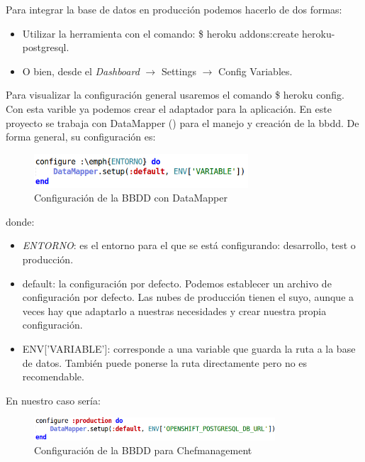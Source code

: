 Para integrar la base de datos en producción podemos hacerlo de dos formas:
\begin{itemize}
	\item Utilizar la herramienta con el comando: \$ heroku addons:create heroku-postgresql.
	\item O bien, desde el \emph{Dashboard} $\rightarrow$ Settings $\rightarrow$ Config Variables.
\end{itemize}

Para visualizar la configuración general usaremos el comando \$ heroku config. Con esta varible ya podemos crear el adaptador para la aplicación. En este proyecto se trabaja con DataMapper (\cite{URL:DataMapper}) para el manejo y creación de la bbdd. De forma general, su configuración es: \\

\begin{figure}[H]
	\centering
	\includegraphics[width=8cm]{./images/env01.png}
	\caption{Configuración de la BBDD con DataMapper} \label{fig:env01}
\end{figure}
 
 donde:
 \begin{itemize}
	 \item \emph{ENTORNO}: es el entorno para el que se está configurando: desarrollo, test o producción.
	\item default: la configuración por defecto. Podemos establecer un archivo de configuración por defecto. Las nubes de producción tienen el suyo, aunque a veces hay que adaptarlo a nuestras necesidades y crear nuestra propia configuración.
	\item ENV['VARIABLE']: corresponde a una variable que guarda la ruta a la base de datos. También puede ponerse la ruta directamente pero no es recomendable.
\end{itemize}

En nuestro caso sería: \\

\begin{figure}[H]
	\centering
	\includegraphics[width=9cm]{./images/env02.png}
	\caption{Configuración de la BBDD para Chefmanagement} \label{fig:env02}
\end{figure}

